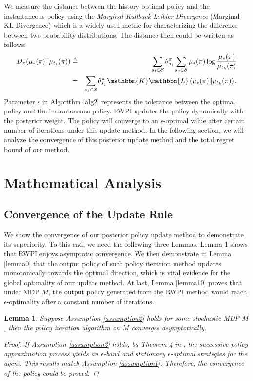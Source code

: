 \documentclass{article}
\theoremstyle{plain}
\newtheorem{lemma}[theorem]{Lemma}
\theoremstyle{definition}
\theoremstyle{remark}
\begin{document}
We measure the distance between the history optimal policy and the instantaneous policy using the \emph{Marginal Kullback-Leibler Divergence} (Marginal KL Divergence) which is a widely used metric for characterizing the difference between two probability distributions. The distance then could be written as follows:
\begin{eqnarray*}
D_{\pi}(\mu_{*}(\pi)||\mu_{t_{k}}(\pi)) &\triangleq& \sum_{s_{1} \in \mathcal{S}} \theta_{s_{1}}^{\pi} \sum_{s_{2} \in \mathcal{S}} \mu_{*}(\pi) \log \frac{\mu_{*}(\pi)}{\mu_{t_{k}}(\pi)} \\
&=&\sum_{s_{1} \in \mathcal{S}} \theta_{s_{1}}^{\pi} \mathbbm{K} \mathbbm{L}\left(\mu_{*}(\pi) \| \mu_{t_{k}}(\pi)\right).
\end{eqnarray*}
Parameter $\epsilon$ in Algorithm \ref{alg2} represents the tolerance between the optimal policy and the instantaneous policy. RWPI updates the policy dynamically with the posterior weight. The policy will converge to an $\epsilon$-optimal value after certain number of iterations under this update method. In the following section, we will analyze the convergence of this posterior update method and the total regret bound of our method.




\section{Mathematical Analysis}
\subsection{Convergence of the Update Rule}
\label{section4.1}
We show the convergence of our posterior policy update method to demonstrate its superiority. To this end, we need the following three Lemmas. Lemma \ref{lemma1} shows that RWPI enjoys asymptotic convergence. We then demonstrate in Lemma \ref{lemma0} that the output policy of such policy iteration method updates monotonically towards the optimal direction, which is vital evidence for the global optimality of our update method. At last, Lemma \ref{lemma10} proves that under MDP $M$, the output policy generated from the RWPI method would reach $\epsilon$-optimality after a constant number of iterations.
\begin{lemma}
\label{lemma1}
Suppose Assumption \ref{assumption2} holds for some stochastic MDP $M$, then the policy iteration algorithm on $M$ converges asymptotically.

\begin{proof}
If Assumption \ref{assumption2} holds, by Theorem 4 in \citet{72bf2cf9895a47e7be9a668a25215110}, the successive policy approximation process yields an $\epsilon$-band and stationary $\epsilon$-optimal strategies for the agent. This results match Assumption \ref{assumption1}. Therefore, the convergence of the policy could be proved.
\end{proof}
\end{lemma}
\end{document}
